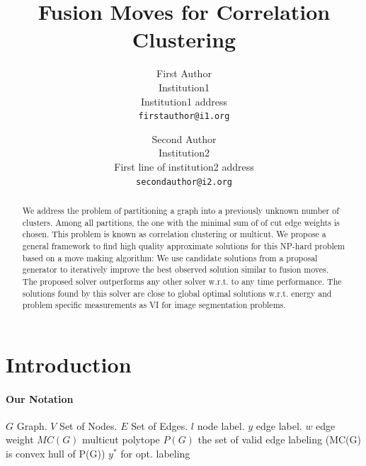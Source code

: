 \documentclass[10pt,twocolumn,letterpaper]{article}
\begin{document}

\title{Fusion Moves for Correlation Clustering}

\author{First Author\\
Institution1\\
Institution1 address\\
{\tt\small firstauthor@i1.org}
\and
Second Author\\
Institution2\\
First line of institution2 address\\
{\tt\small secondauthor@i2.org}
}

\maketitle


\listoftodos[Notes]
\begin{abstract}
   We address the problem of partitioning a  graph
   into a previously unknown number of clusters.
   Among all partitions, the one with the minimal 
   sum of of cut edge weights is chosen. 
   This problem is known as correlation clustering 
   or multicut.
   We propose a general framework to find
   high quality approximate solutions for 
   this NP-hard problem based on a move making algorithm:
   We use candidate solutions from a proposal generator
   to iteratively improve the best observed solution similar
   to fusion moves.
   The proposed solver outperforms any other solver
   w.r.t. to any time performance.
   The solutions found by this solver are close
   to global optimal solutions w.r.t. energy
   and problem specific measurements as VI for
   image segmentation problems.

\end{abstract}
\section{Introduction}


\paragraph{Our Notation}
$G$ Graph.
$V$ Set of Nodes.
$E$ Set of Edges.
$l$ node label.
$y$ edge label.
$w$ edge weight
$MC(G)$ multicut polytope
$P(G)$ the set of valid edge labeling (MC(G) is convex hull of P(G))
$y^*$ for opt. labeling
\end{document}
